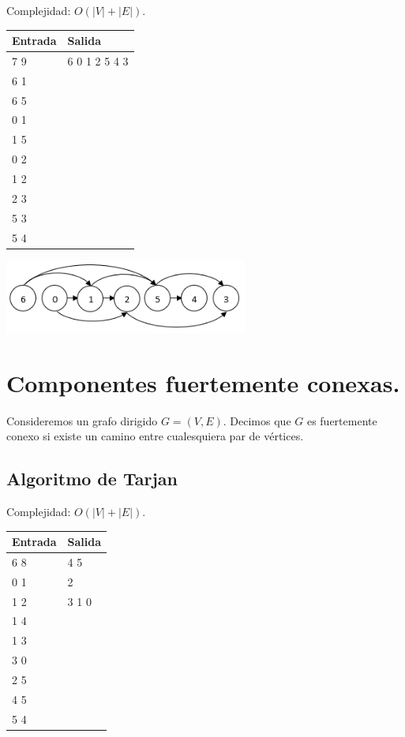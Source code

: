 \documentclass[12pt, letterpaper, twoside]{article}
\begin{document}
Complejidad: $O(|V| + |E|)$.

 \medskip

\begin{tabular}{|p{7cm}|p{7cm}|}
\hline
\textbf{Entrada} & \textbf{Salida}\\ \hline
7 9 & 6 0 1 2 5 4 3\\
6 1 & \\
6 5 & \\
0 1 & \\
1 5 & \\
0 2 & \\
1 2 & \\
2 3 & \\
5 3 & \\ 
5 4 & \\ \hline
\end{tabular}

\begin{center}
\includegraphics[width = 0.6\textwidth]{TopoSort.png}
\end{center}

\newpage

\section{Componentes fuertemente conexas.}

Consideremos un grafo dirigido $G = (V, E)$. Decimos que $G$ es fuertemente conexo si existe un camino entre cualesquiera par de vértices.

\subsection{Algoritmo de Tarjan}

Complejidad: $O(|V| + |E|)$.

 \medskip

\begin{tabular}{|p{7cm}|p{7cm}|}
\hline
\textbf{Entrada} & \textbf{Salida}\\ \hline
6 8 & 4 5\\
0 1 & 2\\
1 2 & 3 1 0\\
1 4 & \\ 
1 3 & \\
3 0 & \\
2 5 & \\
4 5 & \\
5 4 & \\ \hline
\end{tabular}
\end{document}
